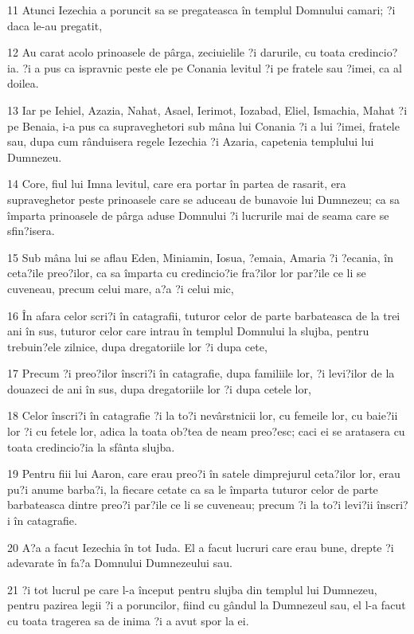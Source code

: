 \par 11 Atunci Iezechia a poruncit sa se pregateasca în templul Domnului camari; ?i daca le-au pregatit,
\par 12 Au carat acolo prinoasele de pârga, zeciuielile ?i darurile, cu toata credincio?ia. ?i a pus ca ispravnic peste ele pe Conania levitul ?i pe fratele sau ?imei, ca al doilea.
\par 13 Iar pe Iehiel, Azazia, Nahat, Asael, Ierimot, Iozabad, Eliel, Ismachia, Mahat ?i pe Benaia, i-a pus ca supraveghetori sub mâna lui Conania ?i a lui ?imei, fratele sau, dupa cum rânduisera regele Iezechia ?i Azaria, capetenia templului lui Dumnezeu.
\par 14 Core, fiul lui Imna levitul, care era portar în partea de rasarit, era supraveghetor peste prinoasele care se aduceau de bunavoie lui Dumnezeu; ca sa împarta prinoasele de pârga aduse Domnului ?i lucrurile mai de seama care se sfin?isera.
\par 15 Sub mâna lui se aflau Eden, Miniamin, Iosua, ?emaia, Amaria ?i ?ecania, în ceta?ile preo?ilor, ca sa împarta cu credincio?ie fra?ilor lor par?ile ce li se cuveneau, precum celui mare, a?a ?i celui mic,
\par 16 În afara celor scri?i în catagrafii, tuturor celor de parte barbateasca de la trei ani în sus, tuturor celor care intrau în templul Domnului la slujba, pentru trebuin?ele zilnice, dupa dregatoriile lor ?i dupa cete,
\par 17 Precum ?i preo?ilor înscri?i în catagrafie, dupa familiile lor, ?i levi?ilor de la douazeci de ani în sus, dupa dregatoriile lor ?i dupa cetele lor,
\par 18 Celor înscri?i în catagrafie ?i la to?i nevârstnicii lor, cu femeile lor, cu baie?ii lor ?i cu fetele lor, adica la toata ob?tea de neam preo?esc; caci ei se aratasera cu toata credincio?ia la sfânta slujba.
\par 19 Pentru fiii lui Aaron, care erau preo?i în satele dimprejurul ceta?ilor lor, erau pu?i anume barba?i, la fiecare cetate ca sa le împarta tuturor celor de parte barbateasca dintre preo?i par?ile ce li se cuveneau; precum ?i la to?i levi?ii înscri?i în catagrafie.
\par 20 A?a a facut Iezechia în tot Iuda. El a facut lucruri care erau bune, drepte ?i adevarate în fa?a Domnului Dumnezeului sau.
\par 21 ?i tot lucrul pe care l-a început pentru slujba din templul lui Dumnezeu, pentru pazirea legii ?i a poruncilor, fiind cu gândul la Dumnezeul sau, el l-a facut cu toata tragerea sa de inima ?i a avut spor la ei.

